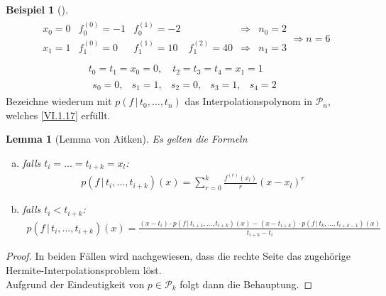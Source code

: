 \documentclass[ngerman,fontsize=11pt, paper=a4, parskip=half, titlepage=true, toc=bib]{scrbook}
\theoremstyle{definition}
\newtheorem{Bsp}[Def]{Beispiel}
\theoremstyle{plain}
\newtheorem{Lem}[Def]{Lemma}		%
\newenvironment{Leme}[1][]{ %
  \begin{Lem}[#1] }
  {\end{Lem}
  	\addtocounter{subsection}{1}}
\newenvironment{Bspe}[1][]{ %
  \begin{Bsp}[#1]}
  {\end{Bsp}
  	\addtocounter{subsection}{1}}
\begin{document}
\begin{Bspe}\label{6.1.13}
  \begin{align*}
     \begin{array}{ccccrc}
       x_0=0 & f_0^{(0)} = -1 & f_0^{(1)}= -2 
       && \Rightarrow & n_0=2 \\
       x_1=1 & f_1^{(0)} = 0 &  f_1^{(1)}= 10 & f_1^{(2)}=40               
                      &\Rightarrow & n_1=3 \\
     \end{array}\Longrightarrow n=6
\end{align*}
\begin{gather*}
    t_0 = t_1 =x_0=0, \quad t_2=t_3=t_4=x_1=1 \\
     \begin{array}{ccccc}
       s_0=0, & s_1=1, & s_2=0, & s_3=1, & s_4=2
     \end{array}
   \end{gather*}
Bezeichne wiederum mit $p(f\,| \, t_0,\dots, t_n)$
das Interpolationspolynom in $\mathcal{P}_n$,
welches \eqref{VI.1.17} erfüllt.
\end{Bspe}

\begin{Leme}[Lemma von Aitken]
\label{6.1.14}
Es gelten die Formeln
\begin{enumerate}[a)]
\item falls $t_i=\dots = t_{i+k}=x_l$:
  \begin{gather}
    p(f\,|\, t_i,\dots, t_{i+k})(x) 
    = \sum_{r=0}^{k}\frac{f^{(r)}(x_l)}{r}(x-x_l)^r
    \label{VI.1.19}
  \end{gather}
\item falls $t_i<t_{i+k} $:
  \begin{gather}
    p(f\,|\, t_i,\dots, t_{i+k})(x) 
    = \frac{(x-t_i)\cdot p(f\,|\, t_{i+1},\dots, t_{i+k})(x)
            - (x-t_{i+k})\cdot p(f\,|\,t_k,\dots, t_{i+k-1})(x)}
          {t_{i+k}-t_i}
    \label{VI.1.20}
  \end{gather}
\end{enumerate}
\end{Leme}

\begin{proof}
In beiden Fällen wird nachgewiesen, dass die rechte Seite
das zugehörige Hermite-Interpolationsproblem löst.\\
Aufgrund der Eindeutigkeit von $p\in\mathcal{P}_k$
 folgt dann die Behauptung.
\end{proof}
\end{document}
